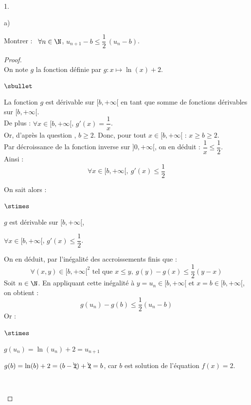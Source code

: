 \documentclass[11pt]{article}%
\begin{document}
\begin{noliste}{1.}
  \item 
  \begin{noliste}{a)}
    \setlength{\itemsep}{2mm}
  \item Montrer : \ $\forall n \in \N$, $ u_{n+1}-b \leq \dfrac{1}{2}
    \, (u_n-b)$.
    
    \begin{proof}~\\
      On note $g$ la fonction définie par $g :x \mapsto \ln(x)+2$.\\
      \begin{noliste}{$\sbullet$}
        \item La fonction $g$ est dérivable sur $[b,+\infty[$ en tant 
        que somme de fonctions dérivables sur $[b,+\infty[$.\\
        De plus : $\forall x \in [b,+\infty[$, $
          g'(x)= \dfrac{1}{x}$.\\
        Or, d'après la question , $b \geq 2$. Donc, pour tout 
        $x \in [b, +\infty[$ : $x \geq b \geq 2$.\\
        Par décroissance de la fonction inverse sur $]0,+\infty[$, on 
        en déduit : $\dfrac{1}{x} \leq \dfrac{1}{2}$.\\
        Ainsi :
        \[
          \forall x \in [b,+\infty[, \ g'(x) \leq \dfrac{1}{2}
        \]
        
        
        
        
        \item On sait alors :
        \begin{noliste}{$\stimes$}
	  \item $g$ est dérivable sur $[b,+\infty[$,
	  \item $\forall x \in [b,+\infty[$, $g'(x) \leq \dfrac{1}{2}$.
	\end{noliste}
	On en déduit, par l'inégalité des accroissements finis que :
	\[
	  \forall (x,y) \in [b,+\infty[^2 \text{ tel que } x\leq y, 
	  \ g(y) - g(x) \leq 
	  \dfrac{1}{2}(y-x)
	\]
	Soit $n\in \N$. En appliquant cette inégalité à $y = u_n \in 
	[b,+\infty[$ et $x=b \in [b,+\infty[$, on obtient :
	\[
	  g(u_n) - g(b) \leq \dfrac{1}{2} (u_n -b)
	\]
	Or :
	\begin{noliste}{$\stimes$}
	  \item $g(u_n) = \ln(u_n)+2 = u_{n+1}$
	  \item $g(b) = \ln(b)+2 = (b-\bcancel{2}) + \bcancel{2}=b$, 
	  car $b$ est solution de l'équation $f(x)=2$.
	\end{noliste}
	~\\[-1.4cm]
      \end{noliste}
    \end{proof}


\end{noliste}
\end{noliste}
\end{document}
